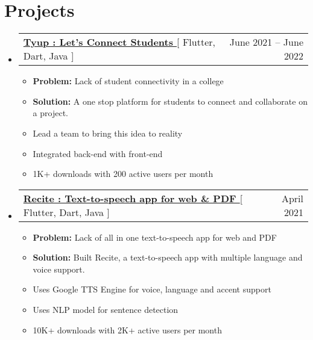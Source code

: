 \documentclass[letterpaper,11pt]{article}
\makeatletter
\newcommand{\resumeItem}[1]{
  \item\small{
    {#1 \vspace{-2pt}}
  }
}
\newcommand{\resumeSubheading}[4]{
  \vspace{-2pt}\item
    \begin{tabular*}{0.97\textwidth}[t]{l@{\extracolsep{\fill}}r}
      \textbf{#1} & #2 \\
      \textit{\small#3} & \textit{\small #4} \\
    \end{tabular*}\vspace{-7pt}
}
\newcommand{\resumeProjectHeading}[2]{
    \item
    \begin{tabular*}{0.97\textwidth}{l@{\extracolsep{\fill}}r}
      \small#1 & #2 \\
    \end{tabular*}\vspace{-7pt}
}
\newcommand{\resumeSubHeadingListStart}{\begin{itemize}[leftmargin=0.15in, label={}]}
\newcommand{\resumeSubHeadingListEnd}{\end{itemize}}
\newcommand{\resumeItemListStart}{\begin{itemize}}
\newcommand{\resumeItemListEnd}{\end{itemize}\vspace{-5pt}}
\makeatother
\begin{document}




\section{Projects}
        
    
    
    \resumeSubHeadingListStart
      \resumeProjectHeading
          {\textbf{\href{https://play.google.com/store/apps/details?id=org.elitecaps.tyup}{Tyup : Let's Connect Students }}{[ Flutter, Dart, Java ]}}{June 2021 -- June 2022}
          \resumeItemListStart
           \resumeItem{\textbf{Problem:} {Lack of student connectivity in a college} }
           \resumeItem{\textbf{Solution:} A one stop platform for students to connect and collaborate on a project.}
           \resumeItem{Lead a team to bring this idea to reality}
           \resumeItem{Integrated back-end with front-end}
           \resumeItem{1K+ downloads with 200 active users per month}
          \resumeItemListEnd
    \resumeSubHeadingListEnd
    
    \resumeSubHeadingListStart
      \resumeProjectHeading
          {\textbf{\href{https://play.google.com/store/apps/details?id=com.hackthedeveloper.recite}{Recite : Text-to-speech app for web \& PDF }}{[ Flutter, Dart, Java ]}}{April 2021}
          \resumeItemListStart
           \resumeItem{\textbf{Problem:} {Lack of all in one text-to-speech app for web and PDF} }
           \resumeItem{\textbf{Solution:} Built Recite, a text-to-speech app with multiple language and voice support.}
           \resumeItem{Uses Google TTS Engine for voice, language and accent support}
           \resumeItem{Uses NLP model for sentence detection}
           \resumeItem{10K+ downloads with 2K+ active users per month}
          \resumeItemListEnd
    \resumeSubHeadingListEnd
    
\end{document}
